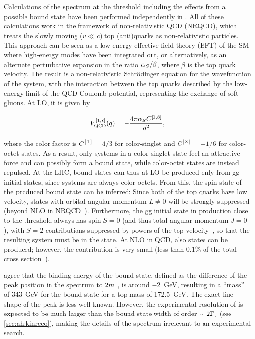 Calculations of the \mWWbb spectrum at the \ttbar threshold including the effects from a possible bound state have been performed independently in . All of these calculations work in the framework of non-relativistic QCD (NRQCD), which treats the slowly moving ($v \ll c$) top (anti)quarks as non-relativistic particles. This approach can be seen as a low-energy effective field theory (EFT) of the SM where high-energy modes have been integrated out, or alternatively, as an alternate perturbative expansion in the ratio $\alpha_S/\beta$, where $\beta$ is the top quark velocity. The result is a non-relativistic Schr\"odinger equation for the wavefunction of the \ttbar system, with the interaction between the top quarks described by the low-energy limit of the QCD Coulomb potential, representing the exchange of soft gluons. At LO, it is given by~\cite{Kiyo:2008bv}

\begin{equation}
    V_{\mathrm{QCD}}^{[1,8]} (q) = - \frac{4 \pi \alpha_S C^{[1,8]}}{q^2} ,
\end{equation}

\noindent where the color factor is $C^{[1]} = 4/3$ for color-singlet and $C^{[8]} = -1/6$ for color-octet states. As a result, only \ttbar systems in a color-singlet state feel an attractive force and can possibly form a bound state, while color-octet states are instead repulsed. At the LHC, \ttbar bound states can thus at LO be produced only from gg initial states, since \qqbar systems are always color-octets. From this, the spin state of the produced bound state can be inferred: Since both of the top quarks have low velocity, states with orbital angular momentum $L \neq 0$ will be strongly suppressed (beyond NLO in NRQCD~\cite{Kiyo:2008bv}). Furthermore, the gg initial state in \ttbar production close to the \ttbar threshold always has spin $S = 0$ (and thus total angular momentum $J = 0$), with $S = 2$ contributions suppressed by powers of the top velocity~\cite{Cheng:2024btk}, so that the resulting \ttbar system must be in the  state. At NLO in QCD, also  states can be produced; however, the contribution is very small (less than $0.1\%$ of the total cross section~\cite{Kiyo:2008bv}).

 agree that the binding energy of the \ttbar bound state, defined as the difference of the peak position in the \mWWbb spectrum to $2 m_{\mathrm{t}}$, is around \SI{-2}{\GeV}, resulting in a ``mass'' of \SI{343}{\GeV} for the \ttbar bound state for a top mass of \SI{172.5}{\GeV}. The exact line shape of the peak is less well known. However, the experimental resolution of \mWWbb is expected to be much larger than the bound state width of order $\sim 2 \Gamma_{\mathrm{t}}$ (see \cref{sec:ah:kinreco}), making the details of the spectrum irrelevant to an experimental search.

